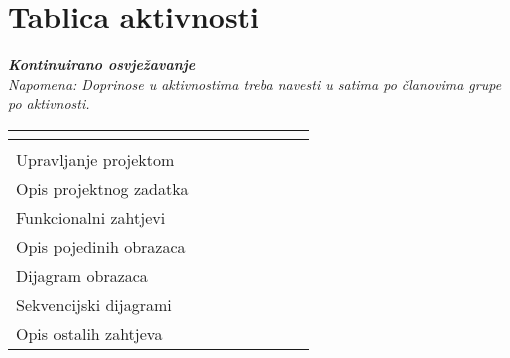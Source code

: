 \begin{packed_enum}
			
			
		\end{packed_enum}
		
		\eject
		\section*{Tablica aktivnosti}
		
			\textbf{\textit{Kontinuirano osvježavanje}}\\
			
			 \textit{Napomena: Doprinose u aktivnostima treba navesti u satima po članovima grupe po aktivnosti.}
					
						
			
			\begin{longtabu} to \textwidth {|X[7, l]|X[1, c]|X[1, c]|X[1, c]|X[1, c]|X[1, c]|X[1, c]|X[1, c]|}
								
				  &      &  &	 &	 &
				 &
				 &	 \\ \hline 
				\endfirsthead
				
			
				  &      &  &	 &
				 &	 &
				 &	 \\ \hline 
				\endhead
				
				
				\endfoot
							
				 
				\endlastfoot
				
				Upravljanje projektom 		&  &  &  &  &  &  & \\ \hline
				Opis projektnog zadatka 	&  &  &  &  &  &  & \\ \hline
				
				Funkcionalni zahtjevi       &  &  &  &  &  &  &  \\ \hline
				Opis pojedinih obrazaca 	&  &  &  &  &  &  &  \\ \hline
				Dijagram obrazaca 			&  &  &  &  &  &  &  \\ \hline
				Sekvencijski dijagrami 		&  &  &  &  &  &  &  \\ \hline
				Opis ostalih zahtjeva 		&  &  &  &  &  &  &  \\ \hline


\end{longtabu}
